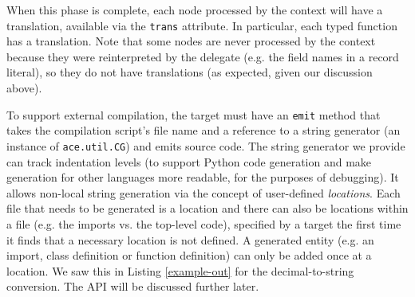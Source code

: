 {When this phase is complete, each node processed by the context will have a translation, available via the \verb|trans| attribute. In particular, each typed function has a translation. Note that some nodes are never processed by the context because they were reinterpreted by the delegate (e.g. the field names in a record literal), so they do not have translations (as expected, given our discussion above).

To support external compilation, the target must have an \verb|emit| method that takes the compilation script's file name and a reference to a string generator (an instance of \verb|ace.util.CG|) and emits source code. The string generator we provide can track indentation levels (to support Python code generation and make generation for other languages more readable, for the purposes of debugging). It allows non-local string generation via the concept of user-defined \emph{locations}.  Each file that needs to be generated is a location and there can also be locations within a file (e.g. the imports vs. the top-level code), specified by a target the first time it finds that a necessary location is not defined. A generated entity (e.g. an import, class definition or function definition) can only be added once at a location. We saw this in Listing \ref{example-out} for the decimal-to-string conversion. The API will be discussed further later. 
}
